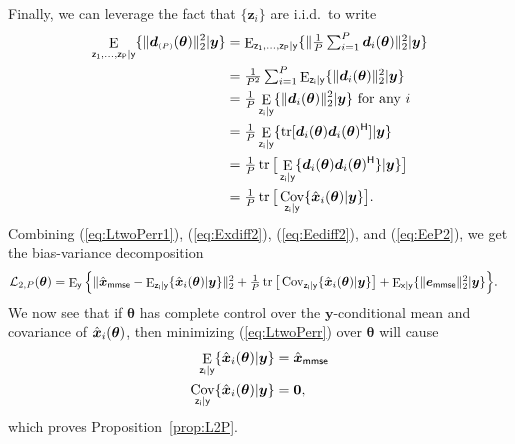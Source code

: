 \documentclass{article}
\theoremstyle{plain}
\theoremstyle{definition}
\theoremstyle{remark}
\newcommand{\ovec}[1]{\boldsymbol{\Bar{#1}}}
\newcommand{\hvec}[1]{\ensuremath{\Hat{\boldsymbol{#1}}}}
\renewcommand{\vec}[1]{\ensuremath{\boldsymbol{#1}}}
\newcommand{\mc}[1]{\ensuremath{\mathcal{#1}}}
\newcommand{\herm}{^{\textsf{H}}}
\DeclareMathOperator{\E}{E}
\DeclareMathOperator{\Cov}{Cov}
\DeclareMathOperator{\tr}{tr}
\renewcommand{\eqref}[1]{(\ref{eq:#1})}
\newcommand{\propref}[1]{Proposition~\ref{prop:#1}}
\newcommand{\mmse}{_{\mathsf{mmse}}}
\newcommand{\Ey}{\E_{\mathsf{y}}}
\newcommand{\Exgy}{\E_{\mathsf{x}|\mathsf{y}}}
\newcommand{\Ezigy}{\E_{\mathsf{z_i}|\mathsf{y}}}
\newcommand{\EzPgy}{\E_{\mathsf{z_1,...,z_P}|\mathsf{y}}}
\newcommand{\Covzigy}{\Cov_{\mathsf{z_i}|\mathsf{y}}}
\newcommand{\Ladv}{\mc{L}_{\mathsf{adv}}}
\newcommand{\LtwoP}{\mc{L}_{2,P}}
\newcommand{\avgP}{_{\scriptscriptstyle (P)}}
\begin{document}
Finally, we can leverage the fact that $\{\vec{z}_i\}$ are i.i.d.\ to write
\begin{align}
\EzPgy\{\|\vec{d}\avgP(\vec{\theta})\|_2^2 | \vec{y}\}
&= \textstyle \EzPgy\{\|\frac{1}{P}\sum_{i=1}^P\vec{d}_i(\vec{\theta})\|_2^2 | \vec{y}\} \\
&= \textstyle \frac{1}{P^2} \sum_{i=1}^P \Ezigy\{\|\vec{d}_i(\vec{\theta})\|_2^2 | \vec{y}\} \\
&= \tfrac{1}{P} \Ezigy\{\|\vec{d}_i(\vec{\theta})\|_2^2 | \vec{y}\} \text{~for any $i$} \\
&= \tfrac{1}{P} \Ezigy\{\tr[\vec{d}_i(\vec{\theta})\vec{d}_i(\vec{\theta})\herm] | \vec{y}\} \\
&= \tfrac{1}{P} \tr\big[ \Ezigy\{\vec{d}_i(\vec{\theta})\vec{d}_i(\vec{\theta})\herm\} | \vec{y}\} \big] \\
&= \tfrac{1}{P} \tr\big[ \Covzigy\{\hvec{x}_i(\vec{\theta}) | \vec{y}\} \big] 
\label{eq:EeP2} .
\end{align}
Combining \eqref{LtwoPerr1}, \eqref{Exdiff2}, \eqref{Eediff2}, and \eqref{EeP2}, we get the bias-variance decomposition
\begin{align}
\LtwoP(\vec{\theta})
&= \textstyle \Ey\Big\{ 
    \|\hvec{x}\mmse-\Ezigy\{\hvec{x}_i(\vec{\theta})|\vec{y}\}\|_2^2 
    + \tfrac{1}{P} \tr\big[ \Covzigy\{\hvec{x}_i(\vec{\theta}) | \vec{y}\} \big]
    + \Exgy\{\|\vec{e}\mmse\|_2^2 | \vec{y}\} 
    \Big\}
\label{eq:LtwoPerr} .
\end{align}
We now see that if $\vec{\theta}$ has complete control over the $\vec{y}$-conditional mean and covariance of $\hvec{x}_i(\vec{\theta})$, then minimizing \eqref{LtwoPerr} over $\vec{\theta}$ will cause
\begin{align}
\Ezigy\{\hvec{x}_i(\vec{\theta})|\vec{y}\} &= \hvec{x}\mmse \\
\Covzigy\{\hvec{x}_i(\vec{\theta}) | \vec{y}\} &= \vec{0} ,
\end{align}
which proves \propref{L2P}.

\end{document}
